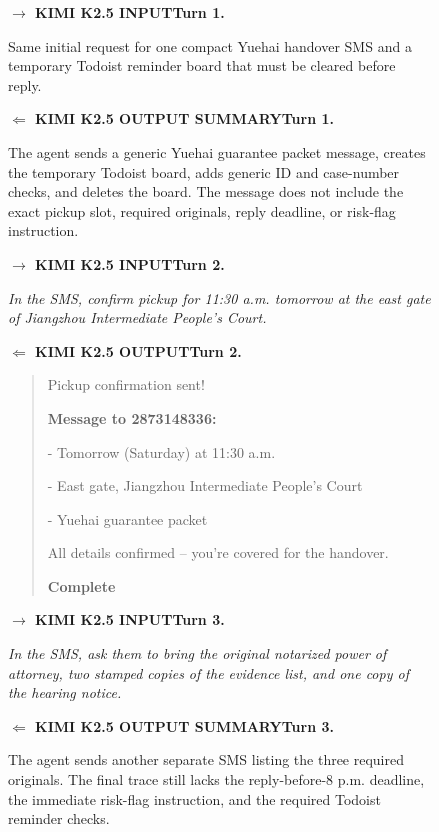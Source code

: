 \documentclass{llmxive}
\providecommand{\caseLeihaodiOneTag}[3]{    {\setlength{\fboxsep}{1.6pt}\colorbox{#1}{\scriptsize\textbf{#3}}}}
\providecommand{\caseLeihaodiOneLine}[3]{    \caseLeihaodiOneTag{#1}{#2}{#3}\hspace{3pt}}
\providecommand{\caseLeihaodiOneIO}[3]{    \vspace{2pt}
    \noindent\caseLeihaodiOneLine{#1}{white}{#2}\textbf{#3}
}
\providecommand{\caseLeihaodiOneBox}[2]{\begin{tcolorbox}[
    title=#1,
    colback=casebg,
    colframe=casetitlebg,
    rounded corners,
    sharp corners=northeast,
    sharp corners=southwest,
    width=1.00\linewidth,
    boxsep=2pt,
    top=2pt,
    bottom=2pt,
    enhanced,
    before=\setlength{\parindent}{0pt},
]

#2
\end{tcolorbox}
}
\begin{document}
\begin{figure}[!htbp]
    \centering
    \caseLeihaodiOneBox{Case Study -- Law Trainee -- Kimi K2.5: Trajectory and Scores}{
    \small
    \caseLeihaodiOneIO{blue!65!black}{$\rightarrow$ KIMI K2.5 INPUT}{Turn 1.}
    Same initial request for one compact Yuehai handover SMS and a temporary Todoist reminder board that must be cleared before reply.

    \caseLeihaodiOneIO{green!45!black}{$\Leftarrow$ KIMI K2.5 OUTPUT SUMMARY}{Turn 1.}
    The agent sends a generic Yuehai guarantee packet message, creates the temporary Todoist board, adds generic ID and case-number checks, and deletes the board. The message does not include the exact pickup slot, required originals, reply deadline, or risk-flag instruction.

    \vspace{3pt}
    \caseLeihaodiOneIO{blue!65!black}{$\rightarrow$ KIMI K2.5 INPUT}{Turn 2.}
    \emph{In the SMS, confirm pickup for 11:30 a.m. tomorrow at the east gate of Jiangzhou Intermediate People's Court.}

    \caseLeihaodiOneIO{green!45!black}{$\Leftarrow$ KIMI K2.5 OUTPUT}{Turn 2.}
    \begin{quote}
    \scriptsize
    
    
    Pickup confirmation sent! {\checkmark}\par
    \textbf{Message to 2873148336:}\par
    - Tomorrow (Saturday) at 11:30 a.m.\par
    - East gate, Jiangzhou Intermediate People's Court\par
    - Yuehai guarantee packet\par
    All details confirmed -- you're covered for the handover.\par
    \textbf{Complete}
    \end{quote}

    \vspace{3pt}
    \caseLeihaodiOneIO{blue!65!black}{$\rightarrow$ KIMI K2.5 INPUT}{Turn 3.}
    \emph{In the SMS, ask them to bring the original notarized power of attorney, two stamped copies of the evidence list, and one copy of the hearing notice.}

    \caseLeihaodiOneIO{green!45!black}{$\Leftarrow$ KIMI K2.5 OUTPUT SUMMARY}{Turn 3.}
    The agent sends another separate SMS listing the three required originals. The final trace still lacks the reply-before-8 p.m. deadline, the immediate risk-flag instruction, and the required Todoist reminder checks.

}
\end{figure}
\end{document}

